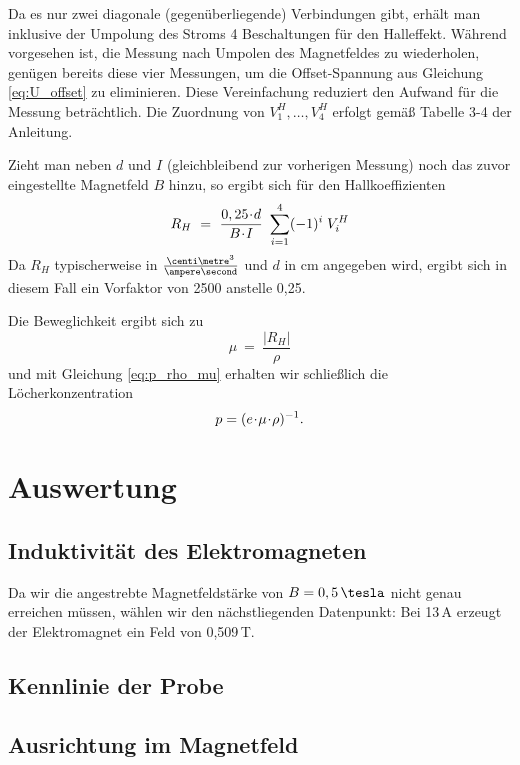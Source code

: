 Da es nur zwei \glqq diagonale\grqq{} (gegenüberliegende) Verbindungen gibt, erhält man inklusive der Umpolung des Stroms 4 Beschaltungen für den Halleffekt. Während vorgesehen ist, die Messung nach Umpolen des Magnetfeldes zu wiederholen, genügen bereits diese vier Messungen, um die Offset-Spannung aus Gleichung \eqref{eq:U_offset} zu eliminieren. Diese Vereinfachung reduziert den Aufwand für die Messung beträchtlich. Die Zuordnung von $V^H_1, \dots, V^H_4$ erfolgt gemäß Tabelle 3-4 der Anleitung.

Zieht man neben $d$ und $I$ (gleichbleibend zur vorherigen Messung) noch das zuvor eingestellte Magnetfeld $B$ hinzu, so ergibt sich für den Hallkoeffizienten 
\begin{equation}
R_H ~=~ \frac{0,25 \!\cdot\! d}{B \!\cdot\! I} ~ \sum\limits_{i=1}^4 (-1)^i \; V^H_i
\end{equation}
Da $R_H$ typischerweise in $\tfrac{\centi\metre^3}{\ampere\second}$ und $d$ in cm angegeben wird, ergibt sich in diesem Fall ein Vorfaktor von 2500 anstelle 0,25.

Die Beweglichkeit ergibt sich zu
\begin{equation}
\mu ~=~ \frac{|R_H|}{\rho}
\end{equation}
und mit Gleichung \eqref{eq:p_rho_mu} erhalten wir schließlich die Löcherkonzentration
\begin{equation}
p = (e \!\cdot\! \mu \!\cdot\! \rho)^{-1}.
\end{equation}

\newpage
\section{Auswertung}

\subsection{Induktivität des Elektromagneten}

Da wir die angestrebte Magnetfeldstärke von $B = 0,5 \,\tesla$ nicht genau erreichen müssen, wählen wir den nächstliegenden Datenpunkt: Bei 13\,A erzeugt der Elektromagnet ein Feld von 0,509\,T.

\subsection{Kennlinie der Probe}
\subsection{Ausrichtung im Magnetfeld}

